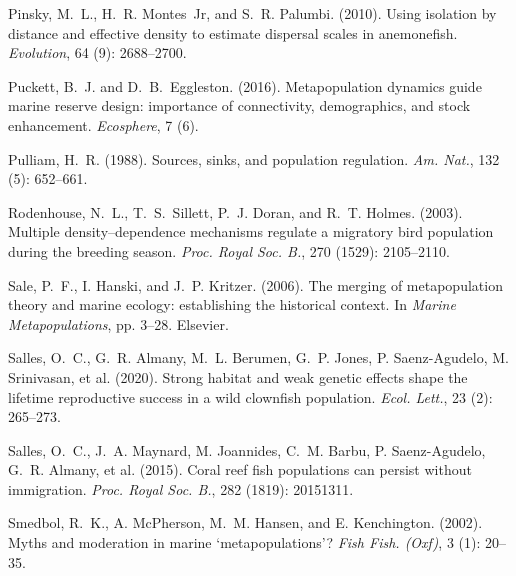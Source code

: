 \documentclass[12pt, oneside]{article}   	%
\begin{document}
\begin{thebibliography}{66}
Pinsky, M.~L., H.~R. Montes~Jr, and S.~R. Palumbi. (2010).
\newblock Using isolation by distance and effective density to estimate
  dispersal scales in anemonefish.
\newblock \emph{Evolution}, 64 (9): 2688--2700.

Puckett, B.~J. and D.~B.~Eggleston. (2016).
\newblock Metapopulation dynamics guide marine reserve design: importance of
  connectivity, demographics, and stock enhancement.
\newblock \emph{Ecosphere}, 7 (6).

Pulliam, H.~R. (1988).
\newblock Sources, sinks, and population regulation.
\newblock \emph{Am. Nat.}, 132 (5): 652--661.

Rodenhouse, N.~L., T.~S.~Sillett, P.~J. Doran, and R.~T. Holmes. (2003).
\newblock Multiple density--dependence mechanisms regulate a migratory bird
  population during the breeding season.
\newblock \emph{Proc. Royal Soc. B.}, 270 (1529): 2105--2110.

Sale, P.~F., I. Hanski, and J.~P. Kritzer. (2006).
\newblock The merging of metapopulation theory and marine ecology: establishing
  the historical context.
\newblock In \emph{Marine Metapopulations}, pp. 3--28. Elsevier.

Salles, O.~C., G.~R. Almany, M.~L. Berumen, G.~P. Jones, P.
  Saenz-Agudelo, M. Srinivasan, et al. (2020).
\newblock Strong habitat and weak genetic effects shape the lifetime
  reproductive success in a wild clownfish population.
\newblock \emph{Ecol. Lett.}, 23 (2): 265--273.

Salles, O.~C., J.~A. Maynard, M. Joannides, C.~M. Barbu, P.
  Saenz-Agudelo, G.~R. Almany, et al. (2015).
\newblock Coral reef fish populations can persist without immigration.
\newblock \emph{Proc. Royal Soc. B.},
  282 (1819): 20151311.

Smedbol, R.~K., A. McPherson, M.~M. Hansen, and E. Kenchington. (2002).
\newblock Myths and moderation in marine ‘metapopulations’?
\newblock \emph{Fish Fish. (Oxf)}, 3 (1): 20--35.


\end{thebibliography}
\end{document}
